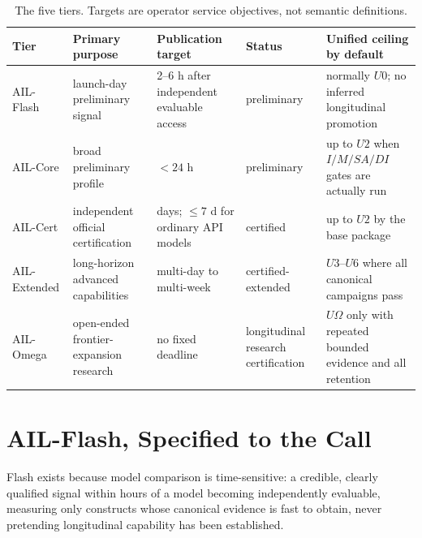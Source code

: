\documentclass[11pt]{article}
\theoremstyle{definition}
\newcommand{\Om}{\ensuremath{\Omega}}
\begin{document}
\begin{table}[!htbp]
\centering\small
\begin{tabularx}{\textwidth}{@{}l Y p{3.0cm} l Y@{}}
\toprule
Tier & Primary purpose & Publication target & Status & Unified ceiling by default \\
\midrule
AIL-Flash & launch-day preliminary signal & 2--6 h after independent evaluable access & preliminary & normally $U0$; no inferred longitudinal promotion \\
AIL-Core & broad preliminary profile & $<24$ h & preliminary & up to $U2$ when $I/M/SA/DI$ gates are actually run \\
AIL-Cert & independent official certification & days; $\le 7$ d for ordinary API models & certified & up to $U2$ by the base package \\
AIL-Extended & long-horizon advanced capabilities & multi-day to multi-week & certified-extended & $U3$--$U6$ where all canonical campaigns pass \\
AIL-Omega & open-ended frontier-expansion research & no fixed deadline & longitudinal research certification & $U\Om$ only with repeated bounded evidence and all retention \\
\bottomrule
\end{tabularx}
\caption{The five tiers. Targets are operator service objectives, not semantic definitions.}
\label{tab:tiers}
\end{table}

\section{AIL-Flash, Specified to the Call}\label{sec:flash}

Flash exists because model comparison is time-sensitive: a credible, clearly qualified signal within hours of a model becoming independently evaluable, measuring only constructs whose canonical evidence is fast to obtain, never pretending longitudinal capability has been established.
\end{document}
